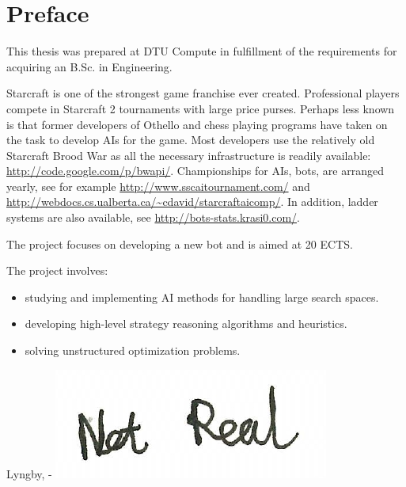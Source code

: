 \chapter{Preface}
This thesis was prepared at DTU Compute in fulfillment of the requirements for acquiring an B.Sc. in Engineering.

Starcraft is one of the strongest game franchise ever created. Professional players compete in Starcraft 2 tournaments with large price purses. Perhaps less known is that former developers of Othello and chess playing programs have taken on the task to develop AIs for the game. Most developers use the relatively old Starcraft Brood War as all the necessary infrastructure is readily available: \url{http://code.google.com/p/bwapi/}. Championships for AIs, bots, are arranged yearly, see for example \url{http://www.sscaitournament.com/} and \url{http://webdocs.cs.ualberta.ca/~cdavid/starcraftaicomp/}. In addition, ladder systems are also available, see \url{http://bots-stats.krasi0.com/}.

The project focuses on developing a new bot and is aimed at 20 ECTS.

The project involves:
\begin{itemize}
	\item studying and implementing AI methods for handling large search spaces.
	\item developing high-level strategy reasoning algorithms and heuristics.
	\item solving unstructured optimization problems.
\end{itemize}

\vspace{20mm}
\begin{center}
    \hspace{20mm} Lyngby, \thesishandin-\thesisyear
    \vspace{5mm}
    \newline
    \includegraphics[scale=0.5]{figures/SignatureDummy}
\end{center}
\begin{flushright}
    \thesisauthor
\end{flushright}
